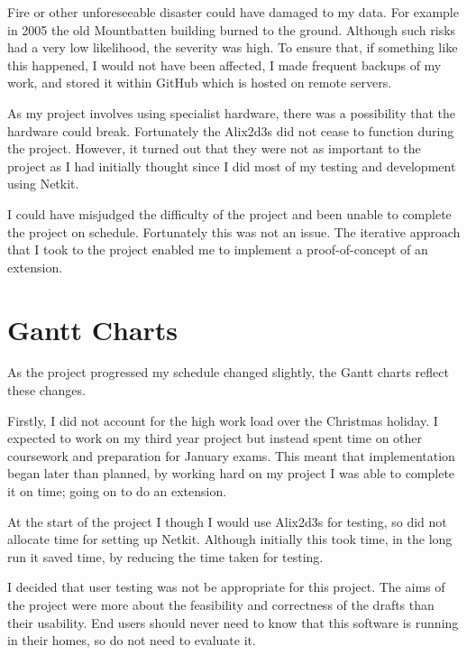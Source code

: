 \documentclass[12pt,a4paper,twoside]{report}
\begin{document}
Fire or other unforeseeable disaster could have damaged to my data. For example
in 2005 the old Mountbatten building burned to the ground. Although such risks
had a very low likelihood, the severity was high.  To ensure that, if something
like this happened, I would not have been affected, I made frequent backups of
my work, and stored it within GitHub which is hosted on remote servers.

As my project involves using specialist hardware, there was a possibility that
the hardware could break. Fortunately the Alix2d3s did not cease to function
during the project. However, it turned out that they were not as important to
the project as I had initially thought since I did most of my testing and
development using Netkit.

I could have misjudged the difficulty of the project and been unable to
complete the project on schedule. Fortunately this was not an issue. The
iterative approach that I took to the project enabled me to implement a
proof-of-concept of an extension.  

\section{Gantt Charts}
As the project progressed my schedule changed slightly, the Gantt charts
reflect these changes.

Firstly, I did not account for the high work load over the Christmas holiday. I
expected to work on my third year project but instead spent time on other
coursework and preparation for January exams. This meant that implementation
began later than planned, by working hard on my project I was able to complete
it on time; going on to do an extension. 

At the start of the project I though I would use Alix2d3s for testing, so
did not allocate time for setting up Netkit. Although initially this took time,
in the long run it saved time, by reducing the time taken for testing. 

I decided that user testing was not be appropriate for this project. The aims
of the project were more about the feasibility and correctness of the drafts
than their usability. End users should never need to know that this software is
running in their homes, so do not need to evaluate it. 
\end{document}
